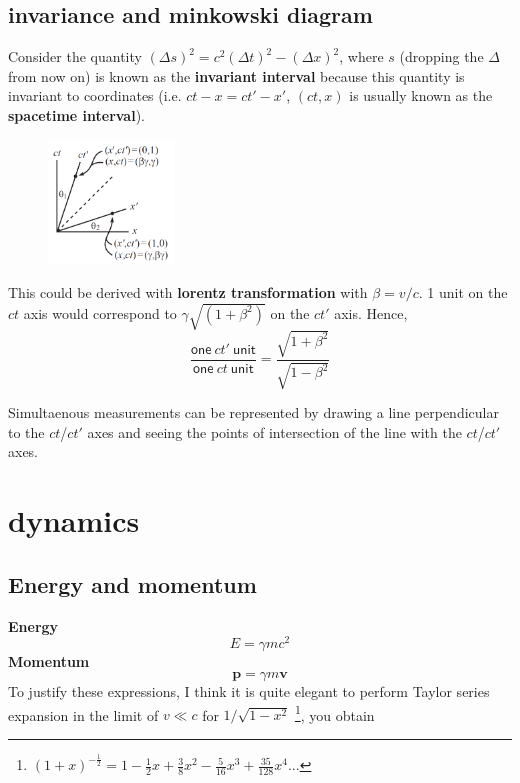 \subsection{invariance and minkowski diagram}
Consider the quantity $(\Delta s)^2= c^2(\Delta t)^2- (\Delta x)^2$, where $s$ (dropping the $\Delta$ from now on) is known as the \textbf{invariant interval} because this quantity is invariant to coordinates (i.e. $ct-x=ct'-x'$, $(ct, x)$ is usually known as the \textbf{spacetime interval}). 

\begin{figure}[H]
    \centering
    \includegraphics[width=0.3\textwidth]{minkowski.png}
\end{figure}
This could be derived with \textbf{lorentz transformation} with $\beta =v/c$. 1 unit on the $ct$ axis would correspond to $\gamma\sqrt{(1+\beta^2)}$ on the $ct'$ axis. Hence,
\begin{equation}
    \frac{\textsf{one} \ ct' \ \textsf{unit}}{\textsf{one} \ ct \ \textsf{unit}}=\frac{\sqrt{1+\beta^2}}{\sqrt{1-\beta^2}}
\end{equation}

Simultaenous measurements can be represented by drawing a line perpendicular to the $ct$/$ct'$ axes and seeing the points of intersection of the line with the $ct$/$ct'$ axes. 

\section{dynamics}
\subsection{Energy and momentum}
\textbf{Energy}
\begin{equation}
    E=\gamma m c^2
\end{equation}
\textbf{Momentum}
\begin{equation}
    \mathbf{p}=\gamma m \mathbf{v}
\end{equation}
To justify these expressions, I think it is quite elegant to perform Taylor series expansion in the limit of $v \ll c$ for $1/\sqrt{1-x^2}$ \footnote{$(1+x)^{-\frac{1}{2}}=1-\frac{1}{2}x+\frac{3}{8}x^2-\frac{5}{16}x^3+\frac{35}{128}x^4...$}, you obtain

